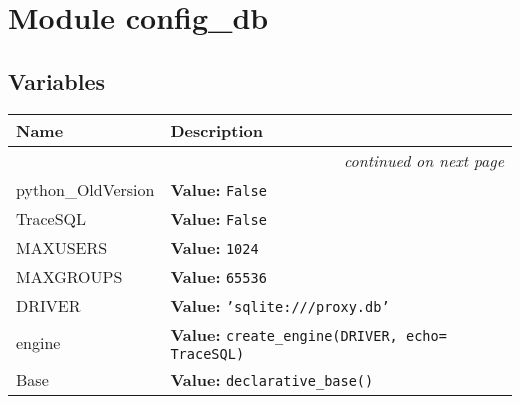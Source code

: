 %
%
%


\section{Module config\_db}

    \label{config_db}


  \subsection{Variables}

    \vspace{-1cm}
\hspace{\varindent}\begin{longtable}{|p{\varnamewidth}|p{\vardescrwidth}|l}
\cline{1-2}
\cline{1-2} \centering \textbf{Name} & \centering \textbf{Description}& \\
\cline{1-2}
\endhead\cline{1-2}\multicolumn{3}{r}{\small\textit{continued on next page}}\\\endfoot\cline{1-2}
\endlastfoot\raggedright p\-y\-t\-h\-o\-n\-\_\-O\-l\-d\-V\-e\-r\-s\-i\-o\-n\- & \raggedright \textbf{Value:} 
{\tt False}&\\
\cline{1-2}
\raggedright T\-r\-a\-c\-e\-S\-Q\-L\- & \raggedright \textbf{Value:} 
{\tt False}&\\
\cline{1-2}
\raggedright M\-A\-X\-U\-S\-E\-R\-S\- & \raggedright \textbf{Value:} 
{\tt 1024}&\\
\cline{1-2}
\raggedright M\-A\-X\-G\-R\-O\-U\-P\-S\- & \raggedright \textbf{Value:} 
{\tt 65536}&\\
\cline{1-2}
\raggedright D\-R\-I\-V\-E\-R\- & \raggedright \textbf{Value:} 
{\tt 'sqlite:///proxy.db'}&\\
\cline{1-2}
\raggedright e\-n\-g\-i\-n\-e\- & \raggedright \textbf{Value:} 
{\tt create\_engine(DRIVER, echo= TraceSQL)}&\\
\cline{1-2}
\raggedright B\-a\-s\-e\- & \raggedright \textbf{Value:} 
{\tt declarative\_base()}&\\
\cline{1-2}
\end{longtable}



